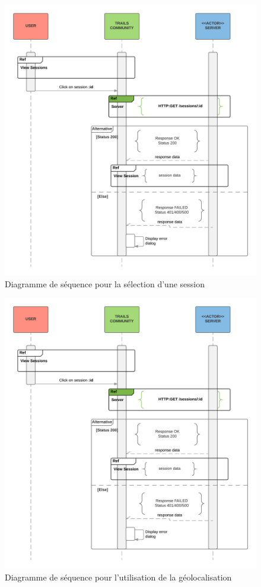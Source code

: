 \documentclass[titlepage, 12pt]{report}
\begin{document}
\begin{figure}[!h]
	\caption{Diagramme de séquence pour la sélection d'une session}
	\label{select_session_sequence_diagram}
	\centering
	\includegraphics[scale=0.5]{Images/diagram/selection_session_sequence_diagram.png}
\end{figure}

\begin{figure}[!h]
	\caption{Diagramme de séquence pour l'utilisation de la géolocalisation}
	\label{user_geolocalisation_sequence_diagram}
	\centering
	\includegraphics[scale=0.5]{Images/diagram/selection_session_sequence_diagram.png}
\end{figure}
\end{document}

